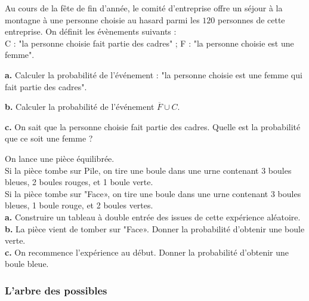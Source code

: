 {\begin{Exercice}
\begin{minipage}[t]{\linewidth}
Au cours de la fête de fin d'année, le comité d'entreprise offre un séjour à la
               montagne à une personne choisie au hasard parmi les $120$ personnes de cette entreprise. On définit les évènements suivants : \\
               C : "la personne choisie fait partie des cadres" ;
               F :  "la personne choisie est une femme".

\medskip
\textbf {a.}   Calculer la probabilité de l'événement :  "la personne choisie est une femme qui fait partie des cadres".

\medskip
\textbf {b.}   Calculer la probabilité de l'événement $\overline{F}\cup C$.

\medskip
\textbf {c.}   On sait que la personne choisie  fait partie des cadres. Quelle est la probabilité que ce soit une femme ?
\end{minipage}

\end{Exercice}



\begin{Exercice}
On lance une pièce équilibrée.\\Si la pièce tombe sur \og{}Pile\fg{}, on tire une boule dans une urne contenant 3 boules bleues, 2 boules rouges,  et 1 boule verte.\\Si la pièce tombe sur  "Face», on tire une boule dans une urne contenant 3 boules bleues, 1 boule rouge,  et 2 boules vertes.\\\textbf {a.}  Construire un tableau à double entrée des issues de cette expérience aléatoire.\\\textbf {b.}  La pièce vient de tomber sur  "Face». Donner la probabilité d'obtenir une boule verte.\\\textbf {c.}  On recommence l'expérience au début. Donner la probabilité d'obtenir une boule bleue.
\end{Exercice}

\newpage

\subsubsection*{L'arbre des possibles}

}
